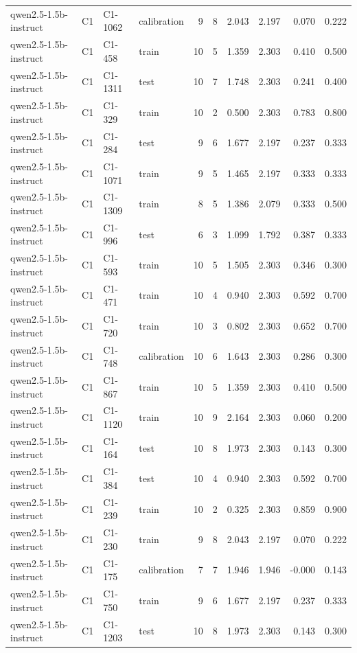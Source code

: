 \begin{table}
\begin{tabular}{llllrrrrrr}
qwen2.5-1.5b-instruct & C1 & C1-1062 & calibration & 9 & 8 & 2.043 & 2.197 & 0.070 & 0.222 \\
qwen2.5-1.5b-instruct & C1 & C1-458 & train & 10 & 5 & 1.359 & 2.303 & 0.410 & 0.500 \\
qwen2.5-1.5b-instruct & C1 & C1-1311 & test & 10 & 7 & 1.748 & 2.303 & 0.241 & 0.400 \\
qwen2.5-1.5b-instruct & C1 & C1-329 & train & 10 & 2 & 0.500 & 2.303 & 0.783 & 0.800 \\
qwen2.5-1.5b-instruct & C1 & C1-284 & test & 9 & 6 & 1.677 & 2.197 & 0.237 & 0.333 \\
qwen2.5-1.5b-instruct & C1 & C1-1071 & train & 9 & 5 & 1.465 & 2.197 & 0.333 & 0.333 \\
qwen2.5-1.5b-instruct & C1 & C1-1309 & train & 8 & 5 & 1.386 & 2.079 & 0.333 & 0.500 \\
qwen2.5-1.5b-instruct & C1 & C1-996 & test & 6 & 3 & 1.099 & 1.792 & 0.387 & 0.333 \\
qwen2.5-1.5b-instruct & C1 & C1-593 & train & 10 & 5 & 1.505 & 2.303 & 0.346 & 0.300 \\
qwen2.5-1.5b-instruct & C1 & C1-471 & train & 10 & 4 & 0.940 & 2.303 & 0.592 & 0.700 \\
qwen2.5-1.5b-instruct & C1 & C1-720 & train & 10 & 3 & 0.802 & 2.303 & 0.652 & 0.700 \\
qwen2.5-1.5b-instruct & C1 & C1-748 & calibration & 10 & 6 & 1.643 & 2.303 & 0.286 & 0.300 \\
qwen2.5-1.5b-instruct & C1 & C1-867 & train & 10 & 5 & 1.359 & 2.303 & 0.410 & 0.500 \\
qwen2.5-1.5b-instruct & C1 & C1-1120 & train & 10 & 9 & 2.164 & 2.303 & 0.060 & 0.200 \\
qwen2.5-1.5b-instruct & C1 & C1-164 & test & 10 & 8 & 1.973 & 2.303 & 0.143 & 0.300 \\
qwen2.5-1.5b-instruct & C1 & C1-384 & test & 10 & 4 & 0.940 & 2.303 & 0.592 & 0.700 \\
qwen2.5-1.5b-instruct & C1 & C1-239 & train & 10 & 2 & 0.325 & 2.303 & 0.859 & 0.900 \\
qwen2.5-1.5b-instruct & C1 & C1-230 & train & 9 & 8 & 2.043 & 2.197 & 0.070 & 0.222 \\
qwen2.5-1.5b-instruct & C1 & C1-175 & calibration & 7 & 7 & 1.946 & 1.946 & -0.000 & 0.143 \\
qwen2.5-1.5b-instruct & C1 & C1-750 & train & 9 & 6 & 1.677 & 2.197 & 0.237 & 0.333 \\
qwen2.5-1.5b-instruct & C1 & C1-1203 & test & 10 & 8 & 1.973 & 2.303 & 0.143 & 0.300 \\

\end{tabular}
\end{table}
